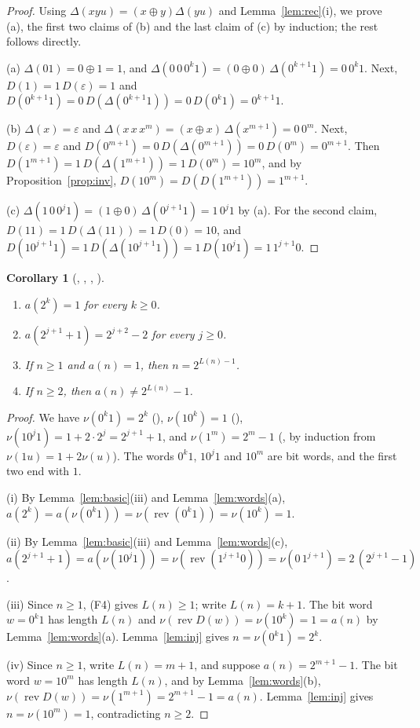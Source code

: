 \documentclass[11pt]{amsart}
\theoremstyle{plain}
\newtheorem{corollary}[theorem]{Corollary}
\theoremstyle{definition}
\newcommand{\rev}{\operatorname{rev}}
\begin{document}
\begin{proof}
Using $\Delta(xyu)=(x\oplus y)\Delta(yu)$ and Lemma~\ref{lem:rec}(i), we prove (a), the first two claims of (b) and the last claim of (c) by induction; the rest follows directly.

(a) $\Delta(01)=0\oplus1=1$, and $\Delta(0\,0\,0^k1)=(0\oplus0)\,\Delta(0^{k+1}1)=0\,0^k1$. Next, $D(1)=1\,D(\varepsilon)=1$ and $D(0^{k+1}1)=0\,D(\Delta(0^{k+1}1))=0\,D(0^k1)=0^{k+1}1$.

(b) $\Delta(x)=\varepsilon$ and $\Delta(x\,x\,x^m)=(x\oplus x)\,\Delta(x^{m+1})=0\,0^m$. Next, $D(\varepsilon)=\varepsilon$ and $D(0^{m+1})=0\,D(\Delta(0^{m+1}))=0\,D(0^m)=0^{m+1}$. Then $D(1^{m+1})=1\,D(\Delta(1^{m+1}))=1\,D(0^m)=10^m$, and by Proposition~\ref{prop:inv}, $D(10^m)=D(D(1^{m+1}))=1^{m+1}$.

(c) $\Delta(1\,0\,0^j1)=(1\oplus0)\,\Delta(0^{j+1}1)=1\,0^j1$ by (a). For the second claim, $D(11)=1\,D(\Delta(11))=1\,D(0)=10$, and $D(10^{j+1}1)=1\,D(\Delta(10^{j+1}1))=1\,D(10^j1)=1\,1^{j+1}0$.
\end{proof}

\begin{corollary}[, , , ]\label{cor:values}\leavevmode
\begin{enumerate}
\item[(i)] $a(2^k)=1$ for every $k\ge0$.
\item[(ii)] $a(2^{j+1}+1)=2^{j+2}-2$ for every $j\ge0$.
\item[(iii)] If $n\ge1$ and $a(n)=1$, then $n=2^{L(n)-1}$.
\item[(iv)] If $n\ge2$, then $a(n)\ne2^{L(n)}-1$.
\end{enumerate}
\end{corollary}

\begin{proof}
We have $\nu(0^k1)=2^k$ (), $\nu(10^k)=1$ (), $\nu(10^j1)=1+2\cdot2^j=2^{j+1}+1$, and $\nu(1^m)=2^m-1$ (, by induction from $\nu(1u)=1+2\nu(u)$). The words $0^k1$, $10^j1$ and $10^m$ are bit words, and the first two end with $1$.

(i) By Lemma~\ref{lem:basic}(iii) and Lemma~\ref{lem:words}(a), $a(2^k)=a(\nu(0^k1))=\nu(\rev(0^k1))=\nu(10^k)=1$.

(ii) By Lemma~\ref{lem:basic}(iii) and Lemma~\ref{lem:words}(c), $a(2^{j+1}+1)=a(\nu(10^j1))=\nu(\rev(1^{j+1}0))=\nu(0\,1^{j+1})=2\,(2^{j+1}-1)$.

(iii) Since $n\ge1$, (F4) gives $L(n)\ge1$; write $L(n)=k+1$. The bit word $w=0^k1$ has length $L(n)$ and $\nu(\rev D(w))=\nu(10^k)=1=a(n)$ by Lemma~\ref{lem:words}(a). Lemma~\ref{lem:inj} gives $n=\nu(0^k1)=2^k$.

(iv) Since $n\ge1$, write $L(n)=m+1$, and suppose $a(n)=2^{m+1}-1$. The bit word $w=10^m$ has length $L(n)$, and by Lemma~\ref{lem:words}(b), $\nu(\rev D(w))=\nu(1^{m+1})=2^{m+1}-1=a(n)$. Lemma~\ref{lem:inj} gives $n=\nu(10^m)=1$, contradicting $n\ge2$.
\end{proof}
\end{document}
